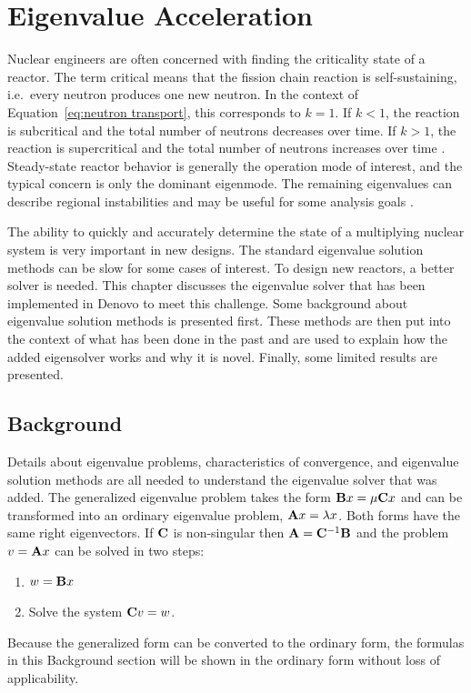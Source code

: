 
\chapter{Eigenvalue Acceleration}
\label{sec:Chp3}
Nuclear engineers are often concerned with finding the criticality state of a reactor. The term critical means that the fission chain reaction is self-sustaining, i.e.\ every neutron produces one new neutron. In the context of Equation~\eqref{eq:neutron transport}, this corresponds to $k = 1$. If $k < 1$, the reaction is subcritical and the total number of neutrons decreases over time. If $k > 1$, the reaction is supercritical and the total number of neutrons increases over time \cite{Duderstadt1976}. Steady-state reactor behavior is generally the operation mode of interest, and the typical concern is only the dominant eigenmode. The remaining eigenvalues can describe regional instabilities and may be useful for some analysis goals \cite{Vidal1998}. 

The ability to quickly and accurately determine the state of a multiplying nuclear system is very important in new designs. The standard eigenvalue solution methods can be slow for some cases of interest. To design new reactors, a better solver is needed. This chapter discusses the eigenvalue solver that has been implemented in Denovo to meet this challenge. Some background about eigenvalue solution methods is presented first. These methods are then put into the context of what has been done in the past and are used to explain how the added eigensolver works and why it is novel. Finally, some limited results are presented.

\section{Background}
Details about eigenvalue problems, characteristics of convergence, and eigenvalue solution methods are all needed to understand the eigenvalue solver that was added. The generalized eigenvalue problem takes the form $\mathbf{B}x = \mu \mathbf{C}x$ and can be transformed into an ordinary eigenvalue problem, $\mathbf{A}x = \lambda x$. Both forms have the same right eigenvectors. If $\mathbf{C}$ is non-singular then $\mathbf{A} = \mathbf{C}^{-1}\mathbf{B}$ and the problem $v = \mathbf{A}x$ can be solved in two steps: \cite{Stewart2001}
%
\begin{enumerate}
  \item $w = \mathbf{B}x$
  \item Solve the system $\mathbf{C}v = w$.
\end{enumerate}
%
Because the generalized form can be converted to the ordinary form, the formulas in this Background section will be shown in the ordinary form without loss of applicability.

